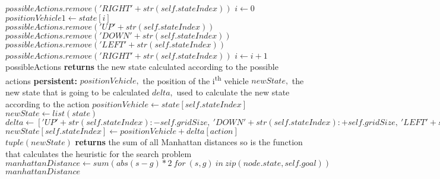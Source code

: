 \documentclass[14pt]{article}
\begin{document}
\begin{algorithmic}
            \State $possibleActions.remove('RIGHT' + str(self.stateIndex))$
        \EndIf
    \EndIf
    \State $i \gets 0$
        \State $positionVehicle1 \gets state[i]$
                \State $possibleActions.remove('UP' + str(self.stateIndex))$
            \EndIf
        \EndIf
                \State $possibleActions.remove('DOWN' + str(self.stateIndex))$
            \EndIf
        \EndIf
                \State $possibleActions.remove('LEFT' + str(self.stateIndex))$
            \EndIf
        \EndIf
                \State $possibleActions.remove('RIGHT' + str(self.stateIndex))$
            \EndIf
        \EndIf
        \State $i \gets i + 1$
    \EndWhile
    \State \Return possibleActions
\EndFunction
\vspace{2.5 mm}
 \textbf{returns} the new state calculated according to the possible actions
    \State \textbf{persistent:} $positionVehicle,$ the position of the 
    i\textsuperscript{th} vehicle
    \State $newState,$ the new state that is going to be calculated
    \State $delta,$ used to calculate the new state according to the action
    \State $positionVehicle \gets state[self.stateIndex]$
    \State $newState \gets list(state)$
    \State $delta \gets ['UP'+ str(self.stateIndex):-self.gridSize, \ 'DOWN'+ str(self.stateIndex):+self.gridSize, \ 'LEFT'+ str(self.stateIndex):-1, \ 'RIGHT'+ str(self.stateIndex):+1, \ 'PUT' + str(self.stateIndex):+0]$
    \State $newState[self.stateIndex] \gets positionVehicle + delta[action]$
    \State \Return $tuple(newState)$
\EndFunction
\vspace{2.5 mm}
 \textbf{returns} the sum of all Manhattan distances so is the function that calculates the heuristic for the search problem
    \State $manhattanDistance \gets sum(abs(s-g)*2 \ for \ (s, g) \ in \ zip(node.state, self.goal))$
    \State \Return $manhattanDistance$
\EndFunction
\end{algorithmic}
\end{document}
